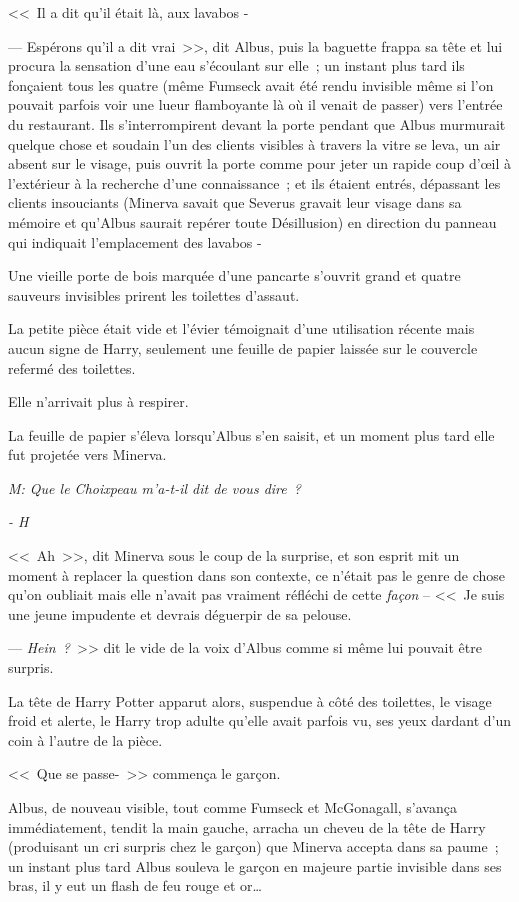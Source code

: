 <<~Il a dit qu'il était là, aux lavabos -

--- Espérons qu'il a dit vrai~>>, dit Albus, puis la baguette frappa sa tête et lui procura la sensation d'une eau s'écoulant sur elle~; un instant plus tard ils fonçaient tous les quatre (même Fumseck avait été rendu invisible même si l'on pouvait parfois voir une lueur flamboyante là où il venait de passer) vers l'entrée du restaurant. Ils s'interrompirent devant la porte pendant que Albus murmurait quelque chose et soudain l'un des clients visibles à travers la vitre se leva, un air absent sur le visage, puis ouvrit la porte comme pour jeter un rapide coup d'œil à l'extérieur à la recherche d'une connaissance~; et ils étaient entrés, dépassant les clients insouciants (Minerva savait que Severus gravait leur visage dans sa mémoire et qu'Albus saurait repérer toute Désillusion) en direction du panneau qui indiquait l'emplacement des lavabos -

Une vieille porte de bois marquée d'une pancarte s'ouvrit grand et quatre sauveurs invisibles prirent les toilettes d'assaut.

La petite pièce était vide et l'évier témoignait d'une utilisation récente mais aucun signe de Harry, seulement une feuille de papier laissée sur le couvercle refermé des toilettes.

Elle n'arrivait plus à respirer.

La feuille de papier s'éleva lorsqu'Albus s'en saisit, et un moment plus tard elle fut projetée vers Minerva.

\emph{M: Que le Choixpeau m'a-t-il dit de vous dire~?}

\emph{- H}

<<~Ah~>>, dit Minerva sous le coup de la surprise, et son esprit mit un moment à replacer la question dans son contexte, ce n'était pas le genre de chose qu'on oubliait mais elle n'avait pas vraiment réfléchi de cette \emph{façon} -- <<~Je suis une jeune impudente et devrais déguerpir de sa pelouse.

--- \emph{Hein~?}~>> dit le vide de la voix d'Albus comme si même lui pouvait être surpris.

La tête de Harry Potter apparut alors, suspendue à côté des toilettes, le visage froid et alerte, le Harry trop adulte qu'elle avait parfois vu, ses yeux dardant d'un coin à l'autre de la pièce.

<<~Que se passe-~>> commença le garçon.

Albus, de nouveau visible, tout comme Fumseck et McGonagall, s'avança immédiatement, tendit la main gauche, arracha un cheveu de la tête de Harry (produisant un cri surpris chez le garçon) que Minerva accepta dans sa paume~; un instant plus tard Albus souleva le garçon en majeure partie invisible dans ses bras, il y eut un flash de feu rouge et or…

